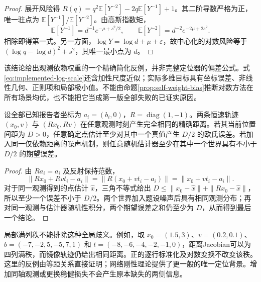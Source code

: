 \begin{proof}
展开风险得 $R(q)=q^2\mathbb E[Y^{-2}]-2q\mathbb E[Y^{-1}]+1$。其二阶导数严格为正，唯一驻点为 $\mathbb E[Y^{-1}]/\mathbb E[Y^{-2}]$。由高斯指数矩，
\[
 \mathbb E[Y^{-1}]=d^{-1}e^{-\mu+s^2/2},\qquad
 \mathbb E[Y^{-2}]=d^{-2}e^{-2\mu+2s^2}.
\]
相除即得第一式。另一方面，$\log Y=\log d+\mu+\varepsilon$，故中心化的对数风险等于 $(\log q-\log d)^2+s^2$，其唯一最小点为 $d$。
\end{proof}

\begin{remark}
该结论给出观测依赖权重的一个精确简化反例，并非完整定位器的偏差公式。式\eqref{eq:implemented-log-scale}还含加性尺度近似；实际多维目标具有坐标误差、非线性几何、正则项和局部极小值。不能由命题\ref{prop:self-weight-bias}推断对数方法在所有场景均优，也不能把它当成第一版全部失败的已证实原因。
\end{remark}

\begin{proposition}[动态镜像歧义与不可区分性下界]
\label{prop:mirror}
设全部已知报告者坐标为 $a_i=(b_i,0)$，$R=\operatorname{diag}(1,-1)$。两条恒速轨迹 $(x_0,v)$ 与 $(Rx_0,Rv)$ 在任意观测时刻产生完全相同的精确距离。若其当前位置间距为 $D>0$，任意确定点估计至少对其中一个真值产生 $D/2$ 的欧氏误差。若加入同一仅依赖距离的噪声机制，则任意随机估计器至少在其中一个世界具有不小于 $D/2$ 的期望误差。
\end{proposition}

\begin{proof}
由 $Ra_i=a_i$ 及反射保持范数，
\[
 \|Rx_0+Rv t_i-a_i\|
 =\|R(x_0+v t_i-a_i)\|=\|x_0+v t_i-a_i\|.
\]
对于同一观测得到的点估计 $\widehat x$，三角不等式给出 $D\leq\|x_0-\widehat x\|+\|Rx_0-\widehat x\|$，所以至少一个误差不小于 $D/2$。两个世界加入题设噪声后具有相同观测分布；再对同一观测与估计器随机性积分，两个期望误差之和仍至少为 $D$，从而得到最后一个结论。
\end{proof}

局部满列秩不能排除这种全局歧义。例如，取 $x_0=(1.5,3)$、$v=(0.2,0.1)$、$b=(-7,-2,5,-5,7,1)$ 和 $t=(-8,-6,-4,-2,-1,0)$，距离Jacobian可以为四列满秩，而镜像轨迹仍给出相同距离。正的逐行标准化及对数变换不改变该秩。这里的反例由等距关系直接证明；网络刚性理论提供了更一般的唯一定位背景\cite{eren2004rigidity}。增加同轴观测或更换稳健损失不会产生原本缺失的两侧信息。



